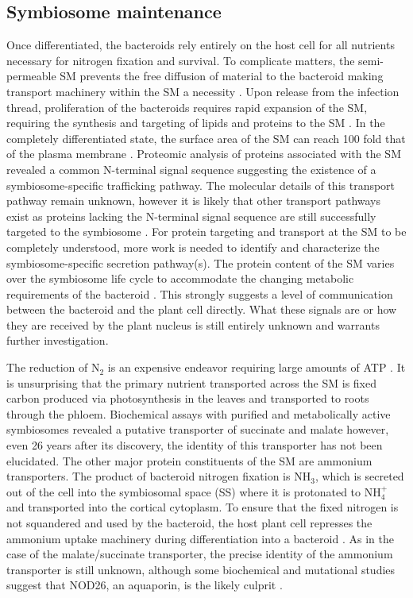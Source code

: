 \subsection*{Symbiosome maintenance}
Once differentiated, the bacteroids rely entirely on the host
cell for all nutrients necessary for nitrogen fixation and survival. To
complicate matters, the semi-permeable SM prevents the free diffusion of
material to the bacteroid making transport machinery within the SM a necessity
\cite{Smith:2014jg}. Upon release from the infection thread, proliferation of
the bacteroids requires rapid expansion of the SM, requiring the
synthesis and targeting of lipids and proteins to the SM \cite{Smith:2014jg}. In
the completely differentiated state, the surface area of the SM can reach 100
fold that of the plasma membrane \cite{Roth:1989vz}. Proteomic analysis of
proteins associated with the SM revealed a common N-terminal signal sequence
\cite{Meckfessel:2012df, Hohnjec:2009uk} suggesting the existence of a
symbiosome-specific trafficking pathway. The molecular details of this transport
pathway remain unknown, however it is likely that other transport pathways exist as
proteins lacking the N-terminal signal sequence are still successfully targeted
to the symbiosome \cite{Catalano:2004du}.  For protein targeting and transport
at the SM to be completely understood, more work is needed to identify and
characterize the symbiosome-specific secretion pathway(s). The protein content
of the SM varies over the symbiosome life cycle to accommodate the changing
metabolic requirements of the bacteroid \cite{Whitehead:1997wu}. This strongly
suggests a level of communication between the bacteroid and the plant cell
directly. What these signals are or how they are received by the plant nucleus
is still entirely unknown and warrants further investigation.  

The reduction of N$_2$ is an expensive endeavor
requiring large amounts of ATP \cite{Halbleib:2000tx}. It is unsurprising that
the primary nutrient transported across the SM is fixed carbon produced via
photosynthesis in the leaves and transported to roots through the phloem.
Biochemical assays with purified and metabolically active symbiosomes revealed
a putative transporter of succinate and malate \cite{Udvardi:1988wm} however,
even 26 years after its discovery, the identity of this transporter has not been elucidated.
The other major protein constituents of the SM are ammonium
transporters. The product of bacteroid nitrogen fixation is NH$_3$, which is
secreted out of the cell into the symbiosomal space (SS) where it is protonated
to NH$_4^+$ and transported into the cortical cytoplasm. To ensure that the
fixed nitrogen is not squandered and used by the bacteroid, the host plant cell
represses the ammonium uptake machinery during differentiation 
into a bacteroid \cite{Howitt:1986wq}. As in the case of the malate/succinate
transporter, the precise identity of the ammonium transporter is still unknown,
although some biochemical and mutational studies suggest that NOD26, an
aquaporin, is the likely culprit \cite{Hwang:2010cs}.

